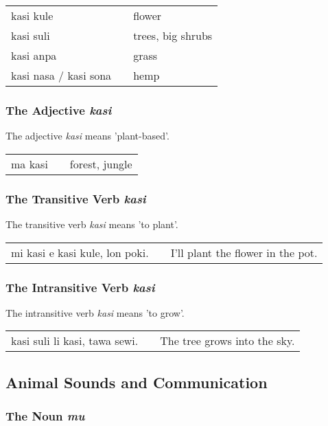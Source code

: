 \begin{supertabular}{p{5,5cm}|ll}
    kasi kule             &  & flower            \\
    kasi suli             &  & trees, big shrubs \\
    kasi anpa             &  & grass             \\
    kasi nasa / kasi sona &  & hemp              \\
\end{supertabular}

\subsubsection*{The Adjective \textit{kasi}}
The adjective \textit{kasi} means 'plant-based'.

\begin{supertabular}{p{5,5cm}|ll}
    ma kasi &  & forest, jungle \\
\end{supertabular}

\subsubsection*{The Transitive Verb \textit{kasi}}
The transitive verb \textit{kasi} means 'to plant'.

\begin{supertabular}{p{5,5cm}|ll}
    mi kasi e kasi kule, lon poki. &  & I'll plant the flower in the pot. \\
\end{supertabular}

\subsubsection*{The Intransitive Verb \textit{kasi}}
The intransitive verb \textit{kasi} means 'to grow'.

\begin{supertabular}{p{5,5cm}|ll}
    kasi suli li kasi, tawa sewi. &  & The tree grows into the sky. \\
\end{supertabular}

\subsection*{Animal Sounds and Communication}
\subsubsection*{The Noun \textit{mu}}

